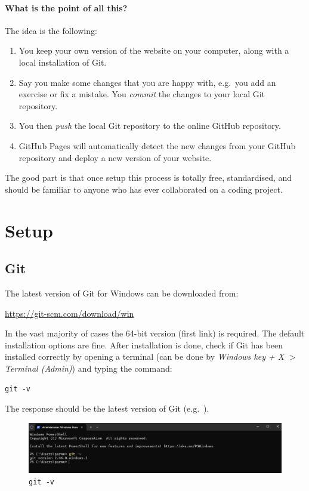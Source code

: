 \documentclass[a4paper,10pt]{article}
\begin{document}
\paragraph{What is the point of all this?} The idea is the following:
\begin{enumerate}
    \item You keep your own version of the website on your computer, along with a local installation of Git.
    \item Say you make some changes that you are happy with, e.g.\ you add an exercise or fix a mistake. You \emph{commit} the changes to your local Git repository.
    \item You then \emph{push} the local Git repository to the online GitHub repository.
    \item GitHub Pages will automatically detect the new changes from your GitHub repository and deploy a new version of your website.
\end{enumerate}
The good part is that once setup this process is totally free, standardised, and should be familiar to anyone who has ever collaborated on a coding project. 

\section{Setup}

\subsection{Git}

The latest version of Git for Windows can be downloaded from:

\url{https://git-scm.com/download/win}

In the vast majority of cases the 64-bit version (first link) is required. The default installation options are fine. After installation is done, check if Git has been installed correctly by opening a terminal (can be done by \emph{Windows key + X} $>$ \emph{Terminal (Admin)}) and typing the command: 

\texttt{git -v}

The response should be the latest version of Git (e.g.\ ). 

\begin{figure}[htbp]
    \centering
    \includegraphics[width=\textwidth]{git-v.png}
    \caption{\texttt{git -v}}
    \label{fig:git-v}   
\end{figure}
\end{document}
